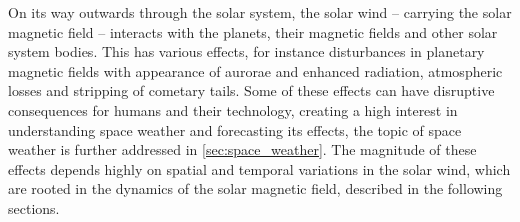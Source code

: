 On its way outwards through the solar system, the solar wind -- carrying the solar magnetic field -- interacts with the planets, their magnetic fields and other solar system bodies. This has various effects, for instance disturbances in planetary magnetic fields with appearance of aurorae and enhanced radiation, atmospheric losses and stripping of cometary tails. Some of these effects can have disruptive consequences for humans and their technology, creating a high interest in understanding space weather and forecasting its effects, the topic of space weather is further addressed in \autoref{sec:space_weather}. The magnitude of these effects depends highly on spatial and temporal variations in the solar wind, which are rooted in the dynamics of the solar magnetic field, described in the following sections.




